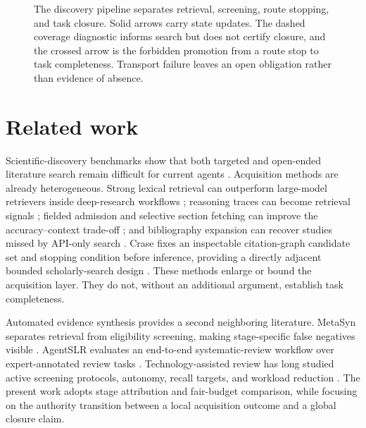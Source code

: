 \documentclass[a4paper,fleqn]{cas-sc}
\theoremstyle{definition}
\begin{document}



\begin{figure}[t]
\centering

\caption{The discovery pipeline separates retrieval, screening, route stopping,
and task closure. Solid arrows carry state updates. The dashed coverage
diagnostic informs search but does not certify closure, and the crossed arrow is
the forbidden promotion from a route stop to task completeness. Transport
failure leaves an open obligation rather than evidence of absence.}
\label{fig:p2-1}
\end{figure}




\section{Related work}

Scientific-discovery benchmarks show that both targeted and open-ended
literature search remain difficult for current agents
\cite{autoresearchbench2026,researcharena2024}. Acquisition methods are already
heterogeneous. Strong lexical retrieval can outperform large-model retrievers
inside deep-research workflows \cite{sage2026}; reasoning traces can become
retrieval signals \cite{agentir2026}; fielded admission and selective section
fetching can improve the accuracy--context trade-off \cite{sieve2026}; and
bibliography expansion can recover studies missed by API-only search
\cite{rethinkinglitsearch2026}. Crase fixes an inspectable citation-graph
candidate set and stopping condition before inference, providing a directly
adjacent bounded scholarly-search design \cite{hazra2026crase}. These methods
enlarge or bound the acquisition layer.
They do not, without an additional argument, establish task completeness.

Automated evidence synthesis provides a second neighboring literature.
MetaSyn separates retrieval from eligibility screening, making stage-specific
false negatives visible \cite{metasyn2026}. AgentSLR evaluates an end-to-end
systematic-review workflow over expert-annotated review tasks
\cite{agentslr2026}. Technology-assisted review has long studied active
screening protocols, autonomy, recall targets, and workload reduction
\cite{cormack2014tarprotocols,cormack2015autonomycal,vandeschoot2021asreview}.
The present work adopts stage attribution and fair-budget comparison, while
focusing on the authority transition between a local acquisition outcome and a
global closure claim.
\end{document}
